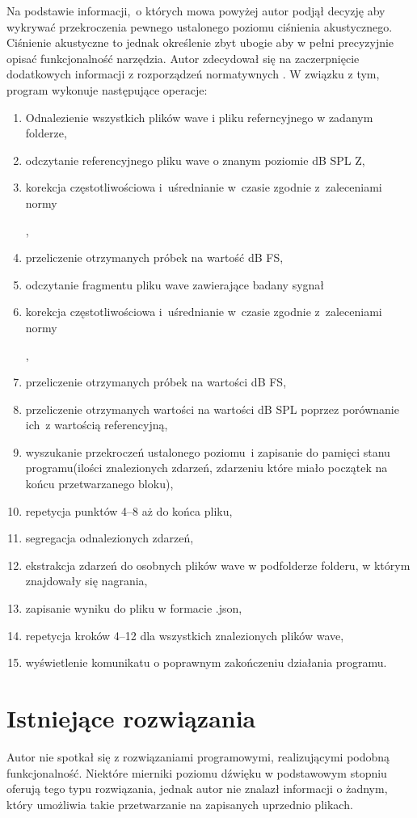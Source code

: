 \documentclass[eng,printmode]{mgr}
\begin{document}
Na podstawie informacji,~o których mowa powyżej autor podjął decyzję aby wykrywać przekroczenia pewnego ustalonego poziomu ciśnienia akustycznego. Ciśnienie akustyczne to jednak określenie zbyt ubogie aby w pełni precyzyjnie opisać funkcjonalność narzędzia. Autor zdecydował się na zaczerpnięcie dodatkowych informacji z rozporządzeń normatywnych \newline\cite{PN-EN_61672-1:2014-03}. W związku z tym, program wykonuje następujące operacje:
\begin{enumerate}
\item Odnalezienie wszystkich plików wave i pliku referncyjnego w zadanym folderze,
\item odczytanie referencyjnego pliku wave o znanym poziomie dB SPL Z,
\item korekcja częstotliwościowa i~uśrednianie w~czasie zgodnie z~zaleceniami normy
  
\cite{PN-EN_61672-1:2014-03},
\item przeliczenie otrzymanych próbek na wartość dB FS,
\item odczytanie fragmentu pliku wave zawierające badany sygnał
\item korekcja częstotliwościowa i~uśrednianie w~czasie zgodnie z~zaleceniami normy 

\cite{PN-EN_61672-1:2014-03},
\item przeliczenie otrzymanych próbek na wartości dB FS,
\item przeliczenie otrzymanych wartości na wartości dB SPL poprzez porównanie ich~z wartością referencyjną,
\item wyszukanie przekroczeń ustalonego poziomu~i zapisanie do pamięci stanu programu(ilości znalezionych zdarzeń, zdarzeniu które miało początek na końcu przetwarzanego bloku),
\item repetycja punktów 4--8 aż do końca pliku,
\item segregacja odnalezionych zdarzeń,
\item ekstrakcja zdarzeń do osobnych plików wave w podfolderze folderu, w którym znajdowały się nagrania,
\item zapisanie wyniku do pliku w formacie .json,
\item repetycja kroków 4--12 dla wszystkich znalezionych plików wave,
\item wyświetlenie komunikatu o poprawnym zakończeniu działania programu.
\end{enumerate}
\section{Istniejące rozwiązania}
Autor nie spotkał się z rozwiązaniami programowymi, realizującymi podobną funkcjonalność. Niektóre mierniki poziomu dźwięku w podstawowym stopniu oferują tego typu rozwiązania, jednak autor nie znalazł informacji o żadnym, który umożliwia takie przetwarzanie na zapisanych uprzednio plikach.
\end{document}
